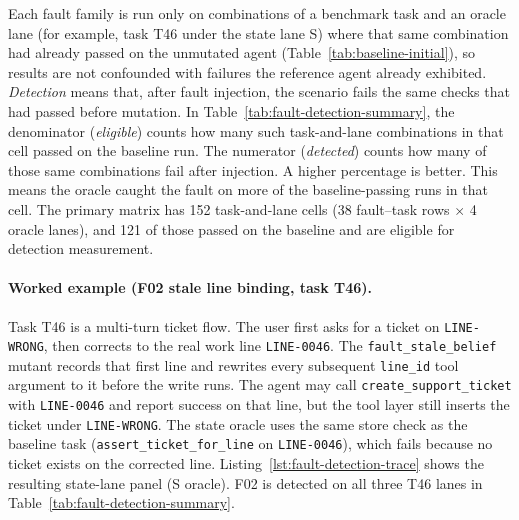 Each fault family is run only on combinations of a benchmark task and an oracle lane (for example, task T46 under the state lane S) where that same combination had already passed on the unmutated agent (Table~\ref{tab:baseline-initial}), so results are not confounded with failures the reference agent already exhibited. \emph{Detection} means that, after fault injection, the scenario fails the same checks that had passed before mutation. In Table~\ref{tab:fault-detection-summary}, the denominator (\emph{eligible}) counts how many such task-and-lane combinations in that cell passed on the baseline run. The numerator (\emph{detected}) counts how many of those same combinations fail after injection. A higher percentage is better. This means the oracle caught the fault on more of the baseline-passing runs in that cell. The primary matrix has 152 task-and-lane cells (38 fault--task rows $\times$ 4 oracle lanes), and 121 of those passed on the baseline and are eligible for detection measurement.

\paragraph{Worked example (F02 stale line binding, task T46).}
Task T46 is a multi-turn ticket flow. The user first asks for a ticket on \texttt{LINE-WRONG}, then corrects to the real work line \texttt{LINE-0046}. The \texttt{fault\_stale\_belief} mutant records that first line and rewrites every subsequent \texttt{line\_id} tool argument to it before the write runs. The agent may call \texttt{create\_support\_ticket} with \texttt{LINE-0046} and report success on that line, but the tool layer still inserts the ticket under \texttt{LINE-WRONG}. The state oracle uses the same store check as the baseline task (\texttt{assert\_ticket\_for\_line} on \texttt{LINE-0046}), which fails because no ticket exists on the corrected line. Listing~\ref{lst:fault-detection-trace} shows the resulting state-lane panel (S oracle). F02 is detected on all three T46 lanes in Table~\ref{tab:fault-detection-summary}.

